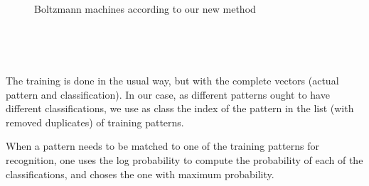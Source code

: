 \ \ \ \ \ \ \ \ \ \ \ \ \ \ \ \ \ \begin{figure}[h]
  \ \ \ \ \ \ \ \ \ \ \ \ \
  \centering
  \caption{Boltzmann machines according to our new method}
\end{figure} \ \ \ \ \ \ \ \ \ \ \ \ \ \ \ \ \ \ \ \ \ \ \ \ \ \ \ \ \ \ \ \ \
\ \ \ \ \ \

\ \ \ \ \ \ \ \ \ \ \ \ \ \ \ \ \ \ \ \ \ \ \ \ \ \ \ \ \ \ \ \ \ \

The training is done in the usual way, but with the complete vectors (actual
pattern and classification). In our case, as different patterns ought to have
different classifications, we use as class the index of the pattern in the list
(with removed duplicates) of training patterns.

When a pattern needs to be matched to one of the training patterns for
recognition, one uses the log probability to compute the
probability of each of the classifications, and choses the one with maximum
probability.



